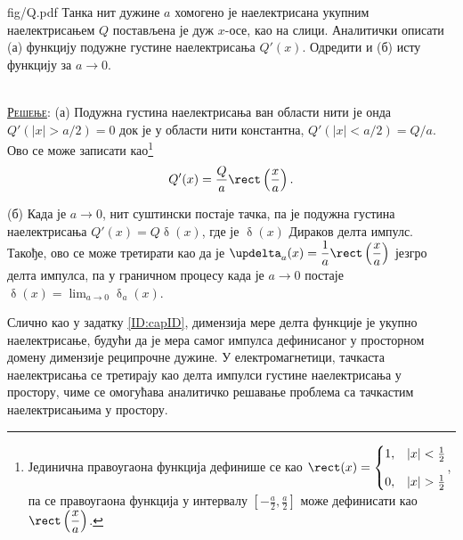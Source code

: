 \noindent
\begin{slikaDesno}[0.833]{fig/Q.pdf}\noindent
\PID 
Танка нит дужине $a$ хомогено је наелектрисана укупним 
наелектрисањем $Q$ постављена је дуж $x$-осе, као на слици. 
Аналитички описати (а) функцију подужне густине 
наелектрисања $Q'(x)$. Одредити и (б) исту функцију за
$a \to 0$. 
\end{slikaDesno} \\[2mm]

\textsc{\underline{Решење}}:
(а) Подужна густина наелектрисања ван области нити је онда 
    $Q'(|x| > a/2) = 0$ док је у области нити константна, $Q'(|x| < a/2) = Q/a$.
    Ово се може записати као\footnote{ Јединична правоугаона функција дефинише се као \vspace*{1mm}
    $\rect(x) = \begin{cases}
        1, & |x| < \frac12 \\[3mm]
        0, & |x| > \frac12 \end{cases}$, 
        па се правоугаона функција у интервалу $\displaystyle \left[-\frac{a}{2}, \frac{a}{2}\right]$ може дефинисати као
        $\rect\left(\dfrac{x}{a}\right)$.}
    \begin{equation}
        Q'(x) = \dfrac{Q}{a} \rect\left(\dfrac{x}{a}\right).
    \end{equation}
    
(б) Када је $a \to 0$, нит суштински постаје тачка, па је подужна густина наелектрисања
    $Q'(x) = Q \updelta(x)$, где је $\updelta(x)$ Дираков делта импулс. Такође, ово се може третирати као да је 
    $\updelta_a(x) = \dfrac{1}{a} \rect\left(\dfrac{x}{a}\right)$ језгро делта импулса, па у граничном процесу 
    \vspace*{1mm}
    када је $a \to 0$ постаје $\updelta(x) = \lim_{a \to 0} \updelta_a(x)$.

Слично као у задатку \ref{ID:capID}, димензија мере делта функције је укупно наелектрисање, будући да је мера
самог импулса дефинисаног у просторном домену димензије реципрочне дужине. 
У електромагнетици, тачкаста наелектрисања се третирају као делта импулси густине наелектрисања у простору, чиме се 
    омогућава аналитичко решавање проблема са тачкастим наелектрисањима у простору.